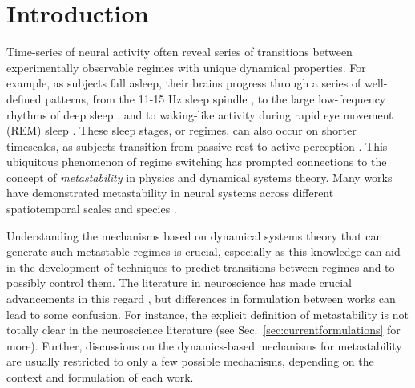 \section{Introduction}

Time-series of neural activity often reveal series of transitions between experimentally observable regimes with unique dynamical properties. For example, as subjects fall asleep, their brains progress through a series of well-defined patterns, from the 11-15 Hz sleep spindle \cite{contreras1996control}, to the large low-frequency rhythms of deep sleep \cite{steriade1993thalamocortical}, and to waking-like activity during rapid eye movement (REM) sleep \cite{jouvet1979does}. These sleep stages, or regimes, can also occur on shorter timescales, as subjects transition from passive rest to active perception \cite{poulet2008internal}. This ubiquitous phenomenon of regime switching has prompted connections to the concept of \textit{metastability} in physics and dynamical systems theory. Many works have demonstrated metastability in neural systems across different spatiotemporal scales and species \cite{michel2017eeg, vandeville2010eeg, lehmann1987eeg, jones2007natural, lacamera2019cortical, mazzucato2019expectation, recanatesi2021metastable, brinkman2022metastable, abeles1995cortical, seidemann1996simultaneously, jercog2017updown, luczak2007sequential, mazor2005transient, sasaki2007metastability, mashour2020conscious, dehaene2005ongoing, hudson2014recovery, tognoli2014metastable, popa2009constracting, curtis2015initiation, fernandez2020sleep, caruso2023single, lang2023temporal}.

Understanding the mechanisms based on dynamical systems theory that can generate such metastable regimes is crucial, especially as this knowledge can aid in the development of techniques to predict transitions between regimes and to possibly control them. The literature in neuroscience has made crucial advancements in this regard \cite{tognoli2014metastable, fingelkurts2017information, graben2019metastable, cavanna2018dynamic, brinkman2022metastable, fonollosa2015learning, deco2016metastability}, but differences in formulation between works can lead to some confusion. For instance, the explicit definition of metastability is not totally clear in the neuroscience literature (see Sec.~\ref{sec:currentformulations} for more). Further, discussions on the dynamics-based mechanisms for metastability are usually restricted to only a few possible mechanisms, depending on the context and formulation of each work.  

